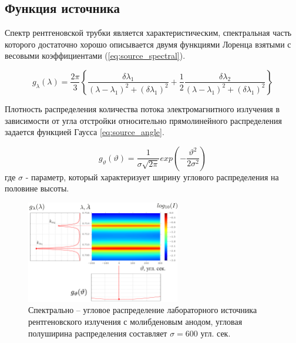 \subsection{Функция источника}
Спектр рентгеновской трубки является характеристическим, спектральная часть
 которого достаточно хорошо описывается двумя функциями Лоренца взятыми с
 весовыми коэффициентами (\ref{eq:source_spectral}).

 \begin{equation} \label{eq:source_spectral}
   g_{\lambda} (\lambda) = \frac{2\pi}{3}  \left \{ \frac{\delta\lambda_1}{(\lambda - \lambda_1)^2+
   (\delta \lambda_1)^2} + \frac{1}{2} \frac{\delta\lambda_2}{(\lambda-\lambda_1)^2+(\delta\lambda_1)^2} \right \}
  \end{equation}

  Плотность распределения количества потока электромагнитного излучения в зависимости от угла
  отстройки относительно прямолинейного распределения задается функцией Гаусса \ref{eq:source_angle}.

  \begin{equation} \label{eq:source_angle}
    g_{\vartheta} (\vartheta) = \frac{1}{\sigma \sqrt{ 2\pi}} exp  ( -\frac{\vartheta^2}{2\sigma^2} )
   \end{equation}
где $\sigma$ - параметр, который характеризует ширину углового распределения на половине высоты.

\begin{figure}[H]
  \centering
  \includegraphics[width=0.6\textwidth]{images/source_distrubition.png}
  \caption{Спектрально – угловое распределение лабораторного источника рентгеновского
   излучения с молибденовым анодом, угловая полуширина распределения составляет $\sigma = 600$ угл. сек. }
  \label{ris:source_distrubition}
\end{figure}


